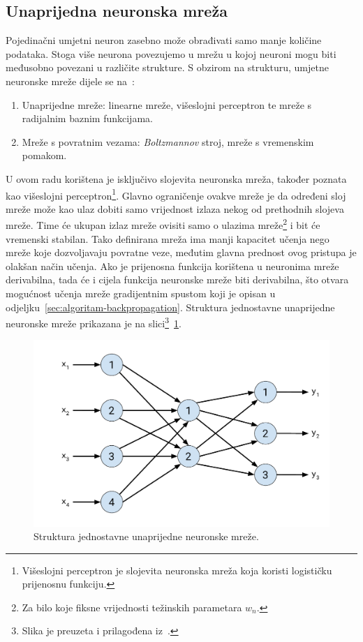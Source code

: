 \subsection{Unaprijedna neuronska mreža}
\label{subsec:unaprijedna-neuronska-mreza}
Pojedinačni umjetni neuron zasebno može obrađivati samo manje količine podataka. Stoga više neurona povezujemo u
mrežu u kojoj neuroni mogu biti međusobno povezani u različite strukture. S obzirom na strukturu, umjetne neuronske
mreže dijele se na\ \citep{cupic2013}:
\begin{enumerate}
    \item Unaprijedne mreže: linearne mreže, višeslojni perceptron te mreže s radijalnim baznim funkcijama.
    \item Mreže s povratnim vezama: \emph{Boltzmannov} stroj, mreže s vremenskim pomakom.
\end{enumerate}
U ovom radu korištena je isključivo slojevita neuronska mreža, također poznata kao višeslojni
perceptron\footnote{Višeslojni perceptron je slojevita neuronska mreža koja koristi logističku prijenosnu funkciju.}.
Glavno ograničenje ovakve mreže je da određeni sloj mreže može kao ulaz dobiti samo vrijednost izlaza nekog od
prethodnih slojeva mreže. Time će ukupan izlaz mreže ovisiti samo o ulazima mreže\footnote{Za bilo koje fiksne
vrijednosti težinskih parametara $w_n$.} i bit će vremenski stabilan. Tako definirana mreža ima manji kapacitet učenja
nego mreže koje dozvoljavaju povratne veze, međutim glavna prednost ovog pristupa je olakšan način učenja. Ako je
prijenosna funkcija korištena u neuronima mreže derivabilna, tada će i cijela funkcija neuronske mreže biti derivabilna,
što otvara mogućnost učenja mreže gradijentnim spustom koji je opisan u odjeljku\ \ref{sec:algoritam-backpropagation}.
Struktura jednostavne unaprijedne neuronske mreže prikazana je na slici\footnote{Slika je preuzeta i prilagođena
iz\ \citep{cupic2013}.}\ \ref{fig:simple-neural-network}.
\begin{figure}[htb]
    \centering
    \includegraphics[width=12cm]{images/simple-neural-network.pdf}
    \caption{Struktura jednostavne unaprijedne neuronske mreže.}
    \label{fig:simple-neural-network}
\end{figure}
